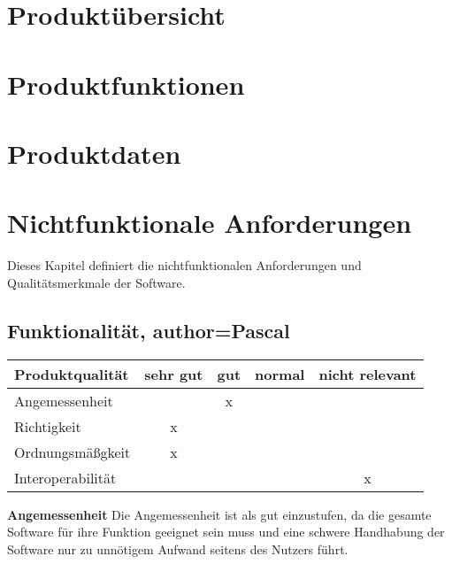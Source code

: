 \documentclass[parskip=full]{scrartcl} %
\begin{document}
\newpage



\section{Produktübersicht}
\newpage



\section{Produktfunktionen}
\newpage



\section{Produktdaten}
\newpage



\section{Nichtfunktionale Anforderungen}

Dieses Kapitel definiert die nichtfunktionalen Anforderungen und Qualitätsmerkmale der Software.





\subsection{Funktionalität, author=Pascal}

\begin{tabular}{|l| c| c| c| c|}
    \hline
        Produktqualität & sehr gut & gut & normal & nicht relevant \\
    \hline
        Angemessenheit & & x & &\\
    \hline
        Richtigkeit & x & & &\\
    \hline
        Ordnungsmäßgkeit & x & & &\\
    \hline
        Interoperabilität & & & & x\\
    \hline
        
    \end{tabular}

\textbf{Angemessenheit}
\newline
Die Angemessenheit ist als gut einzustufen, da die gesamte Software für ihre Funktion geeignet sein muss und eine schwere Handhabung der Software nur zu unnötigem Aufwand seitens des Nutzers führt.
\end{document}

